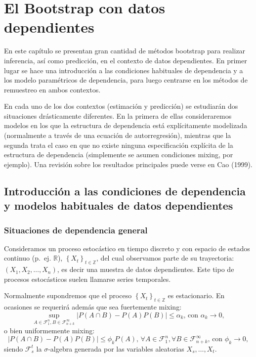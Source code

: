 \documentclass[
]{book}
\theoremstyle{break}
\theoremstyle{nonumberplain}
\begin{document}
\chapter{El Bootstrap con datos dependientes}\label{bootdep}

En este capítulo se presentan gran cantidad de métodos bootstrap para
realizar inferencia, así como predicción, en el contexto de datos
dependientes. En primer lugar se hace una introducción a las condiciones
habituales de dependencia y a los modelo paramétricos de dependencia,
para luego centrarse en los métodos de remuestreo en ambos contextos.

En cada uno de los dos contextos (estimación y predicción) se estudiarán
dos situaciones drásticamente diferentes. En la primera de ellas
consideraremos modelos en los que la estructura de dependencia está
explícitamente modelizada (normalmente a través de una ecuación de
autorregresión), mientras que la segunda trata el caso en que no existe
ninguna especificación explícita de la estructura de dependencia
(simplemente se asumen condiciones mixing, por ejemplo). Una revisión
sobre los resultados principales puede verse en Cao (1999).

\section{Introducción a las condiciones de dependencia y modelos habituales de datos dependientes}\label{introducciuxf3n-a-las-condiciones-de-dependencia-y-modelos-habituales-de-datos-dependientes}

\subsection{Situaciones de dependencia general}\label{situaciones-de-dependencia-general}

Consideramos un proceso estocástico en tiempo discreto y con espacio de
estados continuo (p.~ej. \(\mathbb{R}\)), \(\left\{X_{t}\right\}_{t\in \mathbb{Z}}\),
del cual observamos parte de su trayectoria: \(\left( X_1,X_2,\ldots ,X_n \right)\),
es decir una muestra de datos dependientes.
Este tipo de procesos estocásticos suelen llamarse series temporales.

Normalmente supondremos que el proceso
\(\left\{ X_{t}\right\}_{t\in \mathbb{Z}}\) es estacionario.
En ocasiones se requerirá además que sea fuertemente mixing:
\[\sup_{A\in \mathcal{F}_1^{n},B\in \mathcal{F}_{n+k}^{\infty }}\left\vert
P\left( A\cap B \right) -P\left( A \right) P(B) \right\vert \leq
\alpha _{k}\text{, con }\alpha _{k}\rightarrow 0,\]
o bien uniformemente mixing:
\[\left\vert P\left( A\cap B \right) -P\left( A \right) P(B) \right\vert 
\leq \phi _{k}P\left( A \right) \text{, }\forall A\in \mathcal{F}_1^{n},
\forall B\in \mathcal{F}_{n+k}^{\infty }\text{, con }\phi_{k}\rightarrow 0,\]
siendo \(\mathcal{F}_{s}^{t}\) la \(\sigma\)-algebra generada por las variables aleatorias
\(X_{s},\ldots ,X_{t}\).
\end{document}
